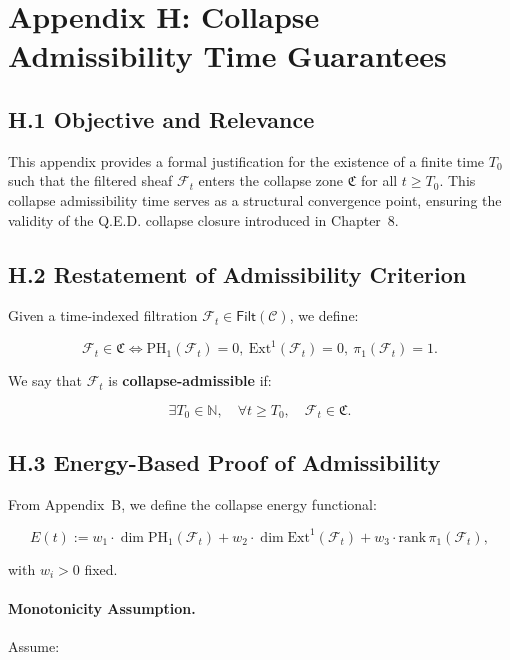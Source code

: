 \documentclass[11pt]{article}
\begin{document}
\appendix
\section*{Appendix H: Collapse Admissibility Time Guarantees}

\subsection*{H.1 Objective and Relevance}

This appendix provides a formal justification for the existence of a finite time \( T_0 \) such that the filtered sheaf \( \mathcal{F}_t \) enters the collapse zone \( \mathfrak{C} \) for all \( t \geq T_0 \). This collapse admissibility time serves as a structural convergence point, ensuring the validity of the Q.E.D. collapse closure introduced in Chapter~8.

\subsection*{H.2 Restatement of Admissibility Criterion}

Given a time-indexed filtration \( \mathcal{F}_t \in \mathsf{Filt}(\mathcal{C}) \), we define:

\[
\mathcal{F}_t \in \mathfrak{C} \iff 
\mathrm{PH}_1(\mathcal{F}_t) = 0,\ 
\mathrm{Ext}^1(\mathcal{F}_t) = 0,\ 
\pi_1(\mathcal{F}_t) = 1.
\]

We say that \( \mathcal{F}_t \) is \textbf{collapse-admissible} if:

\[
\exists T_0 \in \mathbb{N},\quad \forall t \geq T_0,\quad \mathcal{F}_t \in \mathfrak{C}.
\]

\subsection*{H.3 Energy-Based Proof of Admissibility}

From Appendix~B, we define the collapse energy functional:

\[
E(t) := w_1 \cdot \dim \mathrm{PH}_1(\mathcal{F}_t)
+ w_2 \cdot \dim \mathrm{Ext}^1(\mathcal{F}_t)
+ w_3 \cdot \mathrm{rank}\, \pi_1(\mathcal{F}_t),
\]

with \( w_i > 0 \) fixed.

\paragraph{Monotonicity Assumption.}  
Assume:
\end{document}
